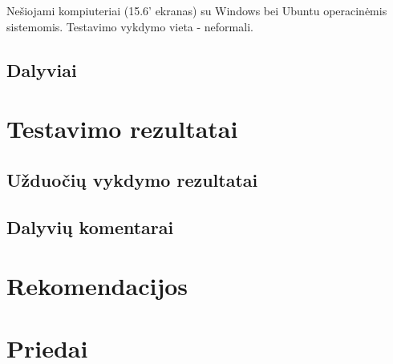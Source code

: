 		Nešiojami kompiuteriai (15.6' ekranas) su Windows bei Ubuntu operacinėmis sistemomis.
		Testavimo vykdymo vieta - neformali.
	
	\subsection{Dalyviai}
	
	

\section{Testavimo rezultatai}

	\subsection{Užduočių vykdymo rezultatai}
	
	\subsection{Dalyvių komentarai}

\section{Rekomendacijos}

	

\section{Priedai}

